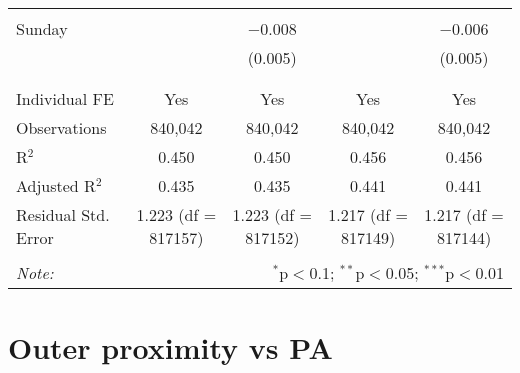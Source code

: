 \documentclass[
]{article}
\begin{document}
\begin{table}[!htbp]
{\begin{tabular}{@{\extracolsep{5pt}}lcccc}
  & & & & \\ 
 Sunday &  & $-$0.008 &  & $-$0.006 \\ 
  &  & (0.005) &  & (0.005) \\ 
  & & & & \\ 
\hline \\[-1.8ex] 
Individual FE & Yes & Yes & Yes & Yes \\ 
Observations & 840,042 & 840,042 & 840,042 & 840,042 \\ 
R$^{2}$ & 0.450 & 0.450 & 0.456 & 0.456 \\ 
Adjusted R$^{2}$ & 0.435 & 0.435 & 0.441 & 0.441 \\ 
Residual Std. Error & 1.223 (df = 817157) & 1.223 (df = 817152) & 1.217 (df = 817149) & 1.217 (df = 817144) \\ 
\hline 
\hline \\[-1.8ex] 
\textit{Note:}  & \multicolumn{4}{r}{$^{*}$p$<$0.1; $^{**}$p$<$0.05; $^{***}$p$<$0.01} \\ 
\end{tabular}
} 
\end{table} 
\newpage
\section{Outer proximity vs PA}
\end{document}
